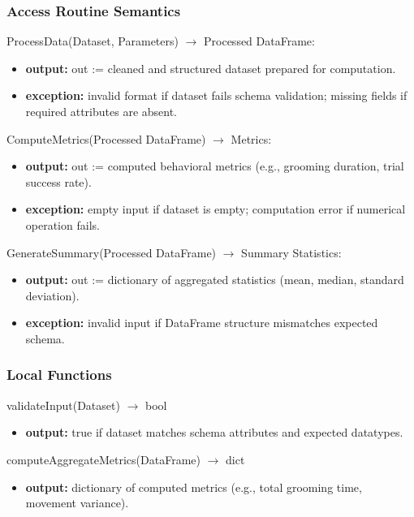 \documentclass[12pt, titlepage]{article}
\begin{document}
\subsubsection{Access Routine Semantics}

\noindent ProcessData(Dataset, Parameters) $\rightarrow$ Processed DataFrame:
\begin{itemize}
    \item \textbf{output:} out := cleaned and structured dataset prepared for computation.
    \item \textbf{exception:} invalid format if dataset fails schema validation; missing fields if required attributes are absent.
\end{itemize}

\noindent ComputeMetrics(Processed DataFrame) $\rightarrow$ Metrics:
\begin{itemize}
    \item \textbf{output:} out := computed behavioral metrics (e.g., grooming duration, trial success rate).
    \item \textbf{exception:} empty input if dataset is empty; computation error if numerical operation fails.
\end{itemize}

\noindent GenerateSummary(Processed DataFrame) $\rightarrow$ Summary Statistics:
\begin{itemize}
    \item \textbf{output:} out := dictionary of aggregated statistics (mean, median, standard deviation).
    \item \textbf{exception:} invalid input if DataFrame structure mismatches expected schema.
\end{itemize}

\subsubsection{Local Functions}

\noindent validateInput(Dataset) $\rightarrow$ bool  
\begin{itemize}
    \item \textbf{output:} true if dataset matches schema attributes and expected datatypes.
\end{itemize}

\noindent computeAggregateMetrics(DataFrame) $\rightarrow$ dict  
\begin{itemize}
    \item \textbf{output:} dictionary of computed metrics (e.g., total grooming time, movement variance).
\end{itemize}
\end{document}
